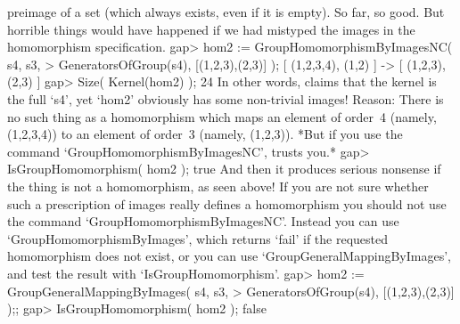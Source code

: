 preimage of a set (which always exists, even if it  is empty). So far, so
good.  But horrible things  would  have happened  if we  had mistyped the
images in the homomorphism specification.
\beginexample
    gap> hom2 := GroupHomomorphismByImagesNC( s4, s3,
    >            GeneratorsOfGroup(s4), [(1,2,3),(2,3)] );
    [ (1,2,3,4), (1,2) ] -> [ (1,2,3), (2,3) ]
    gap> Size( Kernel(hom2) );
    24
\endexample
In  other  words, {\GAP} claims   that the kernel   is the full `s4', yet
`hom2'  obviously has some non-trivial images!   Reason: There is no such
thing  as a  homomorphism which   maps an   element of order~4   (namely,
(1,2,3,4)) to  an element of order~3 (namely,  (1,2,3)). *But  if you use
the command `GroupHomomorphismByImagesNC', {\GAP} trusts you.*
\beginexample
    gap> IsGroupHomomorphism( hom2 );
    true
\endexample
And then it produces serious nonsense if the thing is not a homomorphism,
as seen above! If you are not sure whether such  a prescription of images
really defines a homomorphism you should not use the command
`GroupHomomorphismByImagesNC'.
Instead you can use `GroupHomomorphismByImages', which returns `fail' if
the requested homomorphism does not exist, or you can use
`GroupGeneralMappingByImages', and test the result with
`IsGroupHomomorphism'.
\beginexample
    gap> hom2 := GroupGeneralMappingByImages( s4, s3,
    >            GeneratorsOfGroup(s4), [(1,2,3),(2,3)] );;
    gap> IsGroupHomomorphism( hom2 );
    false
\endexample

